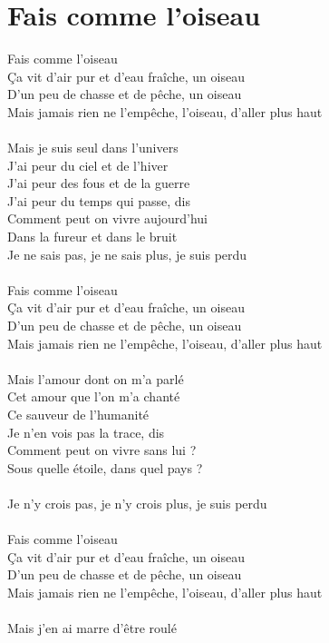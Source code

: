 \section*{Fais comme l'oiseau}
Fais comme l'oiseau\\
Ça vit d'air pur et d'eau fraîche, un oiseau\\
D'un peu de chasse et de pêche, un oiseau\\
Mais jamais rien ne l'empêche, l'oiseau, d'aller plus haut\\\\
Mais je suis seul dans l'univers\\
J'ai peur du ciel et de l'hiver\\
J'ai peur des fous et de la guerre\\
J'ai peur du temps qui passe, dis\\
Comment peut on vivre aujourd'hui\\
Dans la fureur et dans le bruit\\
Je ne sais pas, je ne sais plus, je suis perdu\\\\
Fais comme l'oiseau\\
Ça vit d'air pur et d'eau fraîche, un oiseau\\
D'un peu de chasse et de pêche, un oiseau\\
Mais jamais rien ne l'empêche, l'oiseau, d'aller plus haut\\\\
Mais l'amour dont on m'a parlé\\
Cet amour que l'on m'a chanté\\
Ce sauveur de l'humanité\\
Je n'en vois pas la trace, dis\\
Comment peut on vivre sans lui ?\\
Sous quelle étoile, dans quel pays ?\\\\
Je n'y crois pas, je n'y crois plus, je suis perdu\\\\
Fais comme l’oiseau\\
Ça vit d'air pur et d'eau fraîche, un oiseau\\
D'un peu de chasse et de pêche, un oiseau\\
Mais jamais rien ne l'empêche, l'oiseau, d'aller plus haut\\\\
Mais j'en ai marre d'être roulé\\
